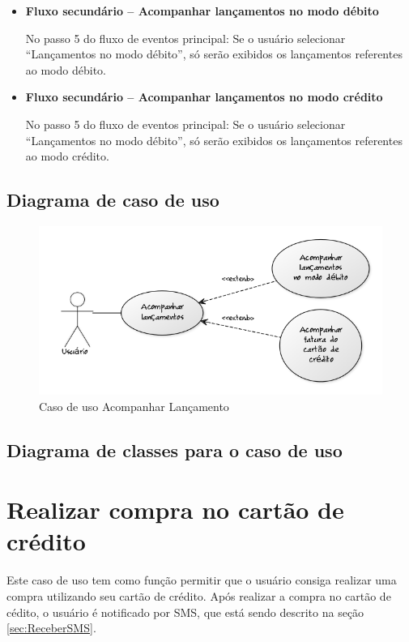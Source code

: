 \begin{itemize}
  \item \textbf{Fluxo secundário – Acompanhar lançamentos no modo débito}

  No passo 5 do fluxo de eventos principal:
  \subitem Se o usuário selecionar ``Lançamentos no modo débito'', só serão exibidos os lançamentos referentes ao modo débito.

  \item \textbf{Fluxo secundário – Acompanhar lançamentos no modo crédito}

  No passo 5 do fluxo de eventos principal:
  \subitem Se o usuário selecionar ``Lançamentos no modo débito'', só serão exibidos os lançamentos referentes ao modo crédito.
\end{itemize}

\subsection{Diagrama de caso de uso}

\begin{figure}[!htb]
     \centering
     \includegraphics[scale=0.6]{diagramas/caso-de-uso/imagens/acompanharLancamento.png}
     \caption{Caso de uso Acompanhar Lançamento}
\end{figure}

\subsection{Diagrama de classes para o caso de uso}

\section{Realizar compra no cartão de crédito}

Este caso de uso tem como função permitir que o usuário consiga realizar uma compra utilizando seu cartão de crédito.
Após realizar a compra no cartão de cédito, o usuário é notificado por SMS, que está sendo descrito na seção \ref{sec:ReceberSMS}.

